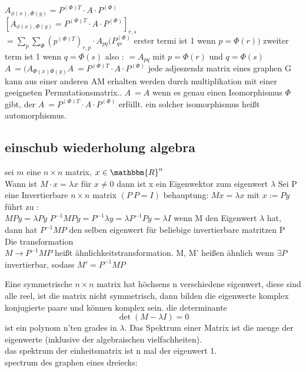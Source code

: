 \documentclass[a4paper]{article}
\theoremstyle{definition}
\theoremstyle{remark}
\begin{document}
$A_{\phi (x),\Phi (y)}= P^{(\Phi ) T}\cdot A\cdot P^{(\Phi )}$\\

$[A_{\phi (x),\Phi (y)}= P^{(\Phi ) T}\cdot A\cdot P^{(\Phi )}]_{r,s}$\\
$= \sum_{p}^{}\sum_{\Phi} (p^{(\Phi )T})_{r,p}\cdot A_{pq}(P^{(\Phi )}_{qs}$
erster termi ist 1 wenn $p=\Phi (r)) $ zweiter term ist 1 wenn $ q=\Phi (s)$
 also :
 $= A_{pq}$ mit $p=\Phi (r)$ und  $q=\Phi (s)$
 $ A^{~}= (A_{\Phi (x) \Phi (y)}
   A^{~}=  P^{(\Phi ) T}\cdot A\cdot P^{(\Phi )}$ 
   jede adjeszendz matrix eines graphen G kann aus einer anderen AM erhalten werden durch multiplikation mit einer geeigneten Permutationsmatrix..
   $A^{~}= A$ wenn es genau einen Isomorphismus $\Phi $ gibt, der $A^{~}=P^{(\Phi ) T}\cdot A\cdot P^{(\Phi )}$ erfüllt.
   ein solcher isomorphismus heißt automorphismus.
\subsection{einschub wiederholung algebra}
\label{sub:einschub_wiederholung_algebra}

	sei $m$ eine $n\times n$ matrix, $x\in \mathbbm{R}^n$
	\\Wann ist $M\cdot x=\lambda x$ für $x\neq 0$ dann ist x ein Eigenwektor zum eigenwert $\lambda $
	Sei P eine Invertierbare $n\times n $ matrix $(P^{~}P=I)$
behauptung:
$Mx=\lambda x$ mit $ x:= Py$ führt zu :\\
$MPy=\lambda Py$
$P^{-1}MPy=P^{-1}\lambda y=\lambda P^{-1}Py=\lambda I$
wenn M den Eigenwert $\lambda$ hat, dann hat $P^{-1}MP$ den selben eigenwert für beliebige invertierbare matritzen P\\
Die transformation \\
$M\rightarrow P^{-1}MP$
heißt ähnlichkeitstransformation. M, M' heißen ähnlich wenn $\exists P$ invertierbar, sodass $M'=P^{-1}MP$

Eine symmetrische $n\times n$ matrix hat höchsens n verschiedene eigenwert, diese sind alle reel, ist die matrix nicht symmetrisch, dann bilden die eigenwerte komplex konjugierte paare und können komplex sein.
die determinante 
\begin{equation}
  \det(M-\lambda I)=0
\end{equation}
ist ein polynom n'ten grades in $\lambda $.
Das Spektrum einer Matrix ist die menge der eigenwerte (inklusive der algebraischen vielfachheiten).\\
das spektrum der einheitsmatrix ist n mal der eigenwert 1.\\
spectrum des graphen eines dreiecks:
\end{document}
